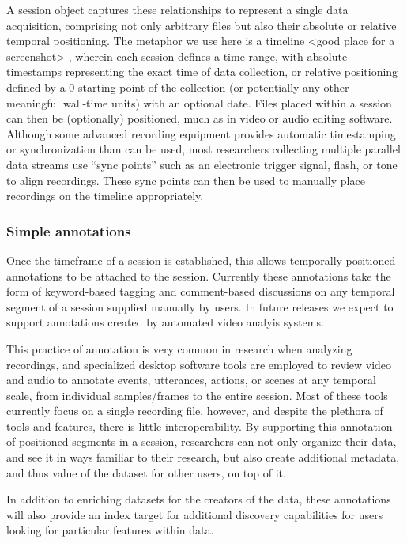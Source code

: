 \documentclass{sig-alternate}
\begin{document}
A session object captures these relationships to represent a single data acquisition, comprising not only arbitrary files but also their absolute or relative temporal positioning.
The metaphor we use here is a timeline <good place for a screenshot> , wherein each session defines a time range, with absolute timestamps representing the exact time of data collection, or relative positioning defined by a 0 starting point of the collection (or potentially any other meaningful wall-time units) with an optional date.
Files placed within a session can then be (optionally) positioned, much as in video or audio editing software.
Although some advanced recording equipment provides automatic timestamping or synchronization than can be used, most researchers collecting multiple parallel data streams use ``sync points'' such as an electronic trigger signal, flash, or tone to align recordings.
These sync points can then be used to manually place recordings on the timeline appropriately.

\subsubsection*{Simple annotations}

Once the timeframe of a session is established, this allows temporally-positioned annotations to be attached to the session.
Currently these annotations take the form of keyword-based tagging and comment-based discussions on any temporal segment of a session supplied manually by users.
In future releases we expect to support annotations created by automated video analyis systems.

This practice of annotation is very common in research when analyzing recordings, and specialized desktop software tools are employed to review video and audio to annotate events, utterances, actions, or scenes at any temporal scale, from individual samples/frames to the entire session.
Most of these tools currently focus on a single recording file, however, and despite the plethora of tools and features, there is little interoperability.
By supporting this annotation of positioned segments in a session, researchers can not only organize their data, and see it in ways familiar to their research, but also create additional metadata, and thus value of the dataset for other users, on top of it.

In addition to enriching datasets for the creators of the data, these annotations will also provide an index target for additional discovery capabilities for users looking for particular features within data.
\end{document}

